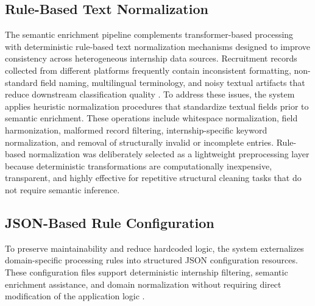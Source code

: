 \subsection{Rule-Based Text Normalization}
The semantic enrichment pipeline complements transformer-based processing with deterministic rule-based text normalization mechanisms designed to improve consistency across heterogeneous internship data sources. Recruitment records collected from different platforms frequently contain inconsistent formatting, non-standard field naming, multilingual terminology, and noisy textual artifacts that reduce downstream classification quality \cite{batini2009methodologies, sarawagi2008information}.
To address these issues, the system applies heuristic normalization procedures that standardize textual fields prior to semantic enrichment. These operations include whitespace normalization, field harmonization, malformed record filtering, internship-specific keyword normalization, and removal of structurally invalid or incomplete entries.
Rule-based normalization was deliberately selected as a lightweight preprocessing layer because deterministic transformations are computationally inexpensive, transparent, and highly effective for repetitive structural cleaning tasks that do not require semantic inference.
\subsection{JSON-Based Rule Configuration}
To preserve maintainability and reduce hardcoded logic, the system externalizes domain-specific processing rules into structured JSON configuration resources. These configuration files support deterministic internship filtering, semantic enrichment assistance, and domain normalization without requiring direct modification of the application logic \cite{bass2012software, kleppmann2017designing}.
